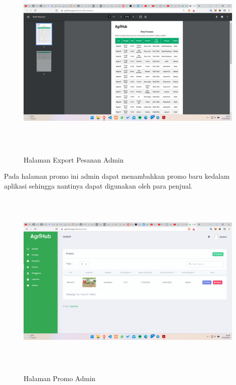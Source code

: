 \begin{enumerate}
\begin{enumerate}
			\begin{figure}[H]
				\centering
				{\includegraphics [width = 14.3cm, height= 9cm]{gambar/admin/export_pesanan_admin}}
				\caption{Halaman Export Pesanan Admin}
				\label{export_pesanan_admin}
			\end{figure}

			\par Pada halaman promo ini admin dapat menambahkan promo baru kedalam aplikasi sehingga nantinya dapat digunakan oleh para penjual.

			\begin{figure}[H]
				\centering
				{\includegraphics [width = 14.3cm, height= 9cm]{gambar/admin/promo}}
				\caption{Halaman Promo Admin}
				\label{promo}
			\end{figure}


\end{enumerate}
\end{enumerate}
